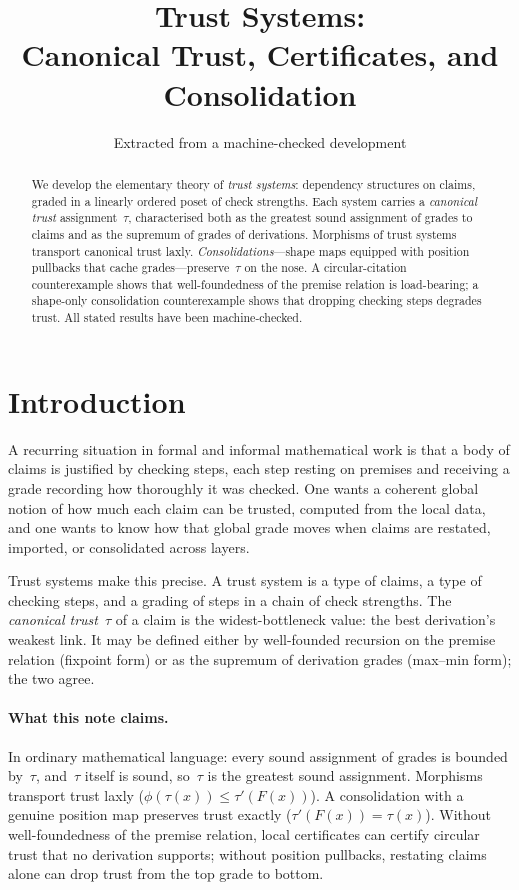 \documentclass[11pt,a4paper]{article}
\title{Trust Systems:\\
  Canonical Trust, Certificates, and Consolidation}
\author{Extracted from a machine-checked development}
\date{}
\theoremstyle{plain}
\theoremstyle{definition}
\begin{document}
\maketitle

\begin{abstract}
We develop the elementary theory of \emph{trust systems}: dependency
structures on claims, graded in a linearly ordered poset of check
strengths. Each system carries a \emph{canonical trust} assignment~$\tau$,
characterised both as the greatest sound assignment of grades to claims
and as the supremum of grades of derivations. Morphisms of trust systems
transport canonical trust laxly. \emph{Consolidations}---shape maps
equipped with position pullbacks that cache grades---preserve~$\tau$ on
the nose. A circular-citation counterexample shows that well-foundedness
of the premise relation is load-bearing; a shape-only consolidation
counterexample shows that dropping checking steps degrades trust.
All stated results have been machine-checked.
\end{abstract}

\tableofcontents
\bigskip

\section{Introduction}

A recurring situation in formal and informal mathematical work is that a
body of claims is justified by checking steps, each step resting on
premises and receiving a grade recording how thoroughly it was checked.
One wants a coherent global notion of how much each claim can be trusted,
computed from the local data, and one wants to know how that global grade
moves when claims are restated, imported, or consolidated across layers.

Trust systems make this precise. A trust system is a type of claims, a
type of checking steps, and a grading of steps in a chain of check
strengths. The \emph{canonical trust}~$\tau$ of a claim is the
widest-bottleneck value: the best derivation's weakest link. It may be
defined either by well-founded recursion on the premise relation
(fixpoint form) or as the supremum of derivation grades (max--min form);
the two agree.

\paragraph{What this note claims.}
In ordinary mathematical language: every sound assignment of grades is
bounded by~$\tau$, and~$\tau$ itself is sound, so~$\tau$ is the greatest
sound assignment. Morphisms transport trust laxly
($\phi(\tau(x)) \le \tau'(F(x))$). A consolidation with a genuine
position map preserves trust exactly
($\tau'(F(x)) = \tau(x)$). Without well-foundedness of the premise
relation, local certificates can certify circular trust that no
derivation supports; without position pullbacks, restating claims alone
can drop trust from the top grade to bottom.
\end{document}
